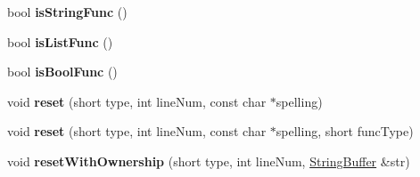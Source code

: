 \begin{DoxyCompactItemize}
\item 
\hypertarget{classCONFIG4CPP__NAMESPACE_1_1LexToken_ababdad1839b5a4508618272e91c104a2}{bool {\bfseries is\-String\-Func} ()}\label{classCONFIG4CPP__NAMESPACE_1_1LexToken_ababdad1839b5a4508618272e91c104a2}

\item 
\hypertarget{classCONFIG4CPP__NAMESPACE_1_1LexToken_a7fe42e162be433a4d696833d0ac9529d}{bool {\bfseries is\-List\-Func} ()}\label{classCONFIG4CPP__NAMESPACE_1_1LexToken_a7fe42e162be433a4d696833d0ac9529d}

\item 
\hypertarget{classCONFIG4CPP__NAMESPACE_1_1LexToken_a3724c1922d0c063c03fc61363bd59f2a}{bool {\bfseries is\-Bool\-Func} ()}\label{classCONFIG4CPP__NAMESPACE_1_1LexToken_a3724c1922d0c063c03fc61363bd59f2a}

\item 
\hypertarget{classCONFIG4CPP__NAMESPACE_1_1LexToken_a569bf5aea25b35fe55862f8955259177}{void {\bfseries reset} (short type, int line\-Num, const char $\ast$spelling)}\label{classCONFIG4CPP__NAMESPACE_1_1LexToken_a569bf5aea25b35fe55862f8955259177}

\item 
\hypertarget{classCONFIG4CPP__NAMESPACE_1_1LexToken_a6990629405376055c4410c01b91b21dd}{void {\bfseries reset} (short type, int line\-Num, const char $\ast$spelling, short func\-Type)}\label{classCONFIG4CPP__NAMESPACE_1_1LexToken_a6990629405376055c4410c01b91b21dd}

\item 
\hypertarget{classCONFIG4CPP__NAMESPACE_1_1LexToken_a01614ea9e3936c9a2dacc726defaf00e}{void {\bfseries reset\-With\-Ownership} (short type, int line\-Num, \hyperlink{classCONFIG4CPP__NAMESPACE_1_1StringBuffer}{String\-Buffer} \&str)}\label{classCONFIG4CPP__NAMESPACE_1_1LexToken_a01614ea9e3936c9a2dacc726defaf00e}

\end{DoxyCompactItemize}
